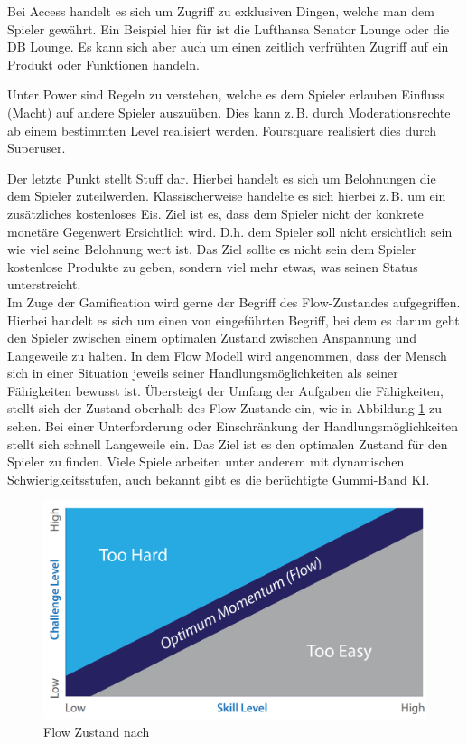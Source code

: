 Bei Access handelt es sich um \glqq Zugriff\grqq{} zu exklusiven Dingen, welche man dem Spieler gewährt. Ein Beispiel hier für ist die Lufthansa Senator Lounge oder die DB Lounge.
Es kann sich aber auch um einen zeitlich verfrühten Zugriff auf ein Produkt oder Funktionen handeln.

Unter Power sind Regeln zu verstehen, welche es dem Spieler erlauben Einfluss (Macht) auf andere Spieler auszuüben. Dies kann z.\,B. durch Moderationsrechte ab einem bestimmten Level realisiert werden. Foursquare realisiert dies durch Superuser.\cite{Lindqvist.2011}

Der letzte Punkt stellt Stuff dar. Hierbei handelt es sich um Belohnungen die dem Spieler zuteilwerden. Klassischerweise handelte es sich hierbei z.\,B. um ein zusätzliches kostenloses Eis. Ziel ist es, dass dem Spieler nicht der konkrete monetäre Gegenwert Ersichtlich wird. D.h. dem Spieler soll nicht ersichtlich sein wie viel seine Belohnung wert ist. Das Ziel sollte es nicht sein dem Spieler kostenlose Produkte zu geben, sondern viel mehr etwas, was seinen Status unterstreicht.\\

Im Zuge der Gamification wird gerne der Begriff des Flow-Zustandes aufgegriffen.
Hierbei handelt es sich um einen von \textcite{Csikszentmihalyi.1991} eingeführten Begriff, bei dem es darum geht den Spieler zwischen einem optimalen Zustand zwischen Anspannung und Langeweile zu halten. In dem Flow Modell wird angenommen, dass der Mensch sich in einer Situation jeweils seiner Handlungsmöglichkeiten als seiner Fähigkeiten bewusst ist.
Übersteigt der Umfang der Aufgaben die Fähigkeiten, stellt sich der Zustand oberhalb des Flow-Zustande ein, wie in Abbildung \ref{img:ch03_img02_flow} zu sehen. Bei einer Unterforderung oder Einschränkung der Handlungsmöglichkeiten stellt sich schnell Langeweile ein. Das Ziel ist es den optimalen Zustand für den Spieler zu finden. Viele Spiele arbeiten unter anderem mit dynamischen Schwierigkeitsstufen, auch bekannt gibt es die berüchtigte Gummi-Band KI.\cite{Bateman.2011}

\begin{figure}[H]
\begin{center}
\includegraphics[width=120mm]{images/ch03_img02_flow.png}
\caption{Flow Zustand nach \textcite{Csikszentmihalyi.1991}}
\label{img:ch03_img02_flow}
\end{center}
\end{figure}

